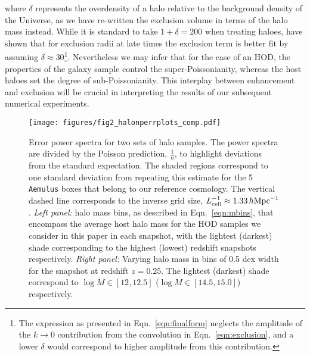 \documentclass[fleqn,usenatbib]{mnras}
\newcommand{\ihmpc}{\,h{\rm Mpc}^{-1}}
\newcommand{\aemulus}{\texttt{Aemulus} }
\begin{document}
where $\delta$ represents the overdensity of a halo relative to the background density of the Universe, as we have re-written the exclusion volume in terms of the halo mass instead. While it is standard to take $1+\delta=200$ when treating haloes, \cite{Baldauf_2013} have shown that for exclusion radii at late times the exclusion term is better fit by assuming $\delta \approx 30$\footnote{The expression as presented in Eqn.~\ref{eqn:finalform} neglects the amplitude of the $k \to 0$ contribution from the convolution in Eqn.~\ref{eqn:exclusion}, and a lower $\delta$ would correspond to higher amplitude from this contribution.}. Nevertheless we may infer that for the case of an HOD, the properties of the galaxy sample control the super-Poissonianity, whereas the host haloes set the degree of sub-Poissonianity. This interplay between enhancement and exclusion will be crucial in interpreting the results of our subsequent numerical experiments.
\begin{figure*}
    \centering
    \texttt{[image: figures/fig2\_halonperrplots\_comp.pdf]}
    \caption{Error power spectra for two sets of halo samples. The power spectra are divided by the Poisson prediction, $\frac{1}{n}$, to highlight deviations from the standard expectation. The shaded regions correspond to one standard deviation from repeating this estimate for the 5 \aemulus  boxes that belong to our reference cosmology. The vertical dashed line corresponds to the inverse grid size, $L_{\rm cell}^{-1} \approx 1.33 \ihmpc$. \emph{Left panel:} halo mass bins, as described in Eqn.~\ref{eqn:mbins}, that encompass the average host halo mass for the HOD samples we consider in this paper in each snapshot, with the lightest (darkest) shade corresponding to the highest (lowest) redshift snapshots respectively. \emph{Right panel:} Varying halo mass in bins of 0.5 dex width for the snapshot at redshift $z=0.25$. The lightest (darkest) shade correspond to $\log M \in [12, 12.5]$ ($\log M \in [14.5, 15.0]$) respectively.}
    \label{fig:haloperr}
\end{figure*}
\end{document}
